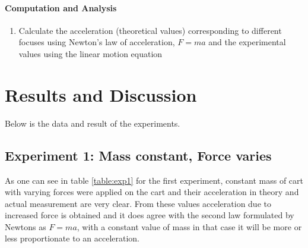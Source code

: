\documentclass[a4paper,12pt]{article}
\begin{document}
\paragraph{Computation and Analysis}
\begin{enumerate}
    \item Calculate the acceleration (theoretical values) corresponding to different focuses using Newton's law of acceleration, \( F = ma \) and the experimental values using the linear motion equation
\end{enumerate}



\section{Results and Discussion}
Below is the data and result of the experiments.

\subsection{Experiment 1: Mass constant, Force varies}
\begin{table}[h]
    \centering
    \renewcommand{\arraystretch}{1.2}
    \caption{Results for Experiment 1: Mass constant, Force varies}
    \label{table:exp1}
\end{table}

As one can see in table \ref{table:exp1} for the first experiment, constant mass of cart with varying forces were applied on the cart and their acceleration in theory and actual measurement are very clear. From these values acceleration due to increased force is obtained and it does agree with the second law formulated by Newtons as \( F = ma \), with a constant value of mass in that case it will be more or less proportionate to an acceleration. \\
\end{document}
